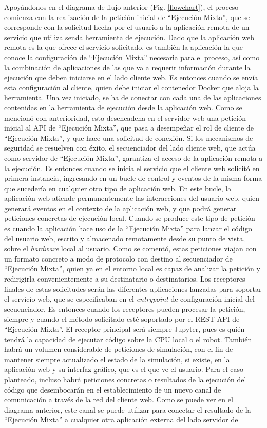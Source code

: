 Apoyándonos en el diagrama de flujo anterior (Fig. \ref{flowchart}), el proceso comienza con la realización de la petición inicial de ``Ejecución Mixta'', que se corresponde con la solicitud hecha por el usuario a la aplicación remota de un servicio que utiliza senda herramienta de ejecución. Dado que la aplicación web remota es la que ofrece el servicio solicitado, es también la aplicación la que conoce la configuración de ``Ejecución Mixta'' necesaria para el proceso, así como la combinación de aplicaciones de las que va a requerir información durante la ejecución que deben iniciarse en el lado cliente web. Es entonces cuando se envía esta configuración al cliente, quien debe iniciar el contenedor Docker que aloja la herramienta. Una vez iniciado, se ha de conectar con cada una de las aplicaciones contenidas en la herramienta de ejecución desde la aplicación web. Como se mencionó con anterioridad, esto desencadena en el servidor web una petición inicial al API de ``Ejecución Mixta'', que pasa a desempeñar el rol de cliente de ``Ejecución Mixta'', y que hace una solicitud de conexión. Si los mecanismos de seguridad se resuelven con éxito, el secuenciador del lado cliente web, que actúa como servidor de ``Ejecución Mixta'', garantiza el acceso de la aplicación remota a la ejecución. Es entonces cuando se inicia el servicio que el cliente web solicitó en primera instancia, ingresando en un bucle de control y eventos de la misma forma que sucedería en cualquier otro tipo de aplicación web. En este bucle, la aplicación web atiende permanentemente las interacciones del usuario web, quien generará eventos en el contexto de la aplicación web, y que podrá generar peticiones concretas de ejecución local. Cuando se produce este tipo de petición es cuando la aplicación hace uso de la ``Ejecución Mixta'' para lanzar el código del usuario web, escrito y almacenado remotamente desde su punto de vista, sobre el \textit{hardware} local al usuario. Como se comentó, estas peticiones viajan con un formato concreto a modo de protocolo con destino al secuenciador de ``Ejecución Mixta'', quien ya en el entorno local es capaz de analizar la petición y redirigirla convenientemente a su destinatario o destinatarios. Los receptores finales de estas solicitudes serán las diferentes aplicaciones lanzadas para soportar el servicio web, que se especificaban en el \textit{entrypoint} de configuración inicial del secuenciador. Es entonces cuando los receptores pueden procesar la petición, siempre y cuando el método solicitado esté soportado por el REST API de ``Ejecución Mixta''. El receptor principal será siempre Jupyter, pues es quién tendrá la capacidad de ejecutar código sobre la CPU local o el robot. También habrá un volumen considerable de peticiones de simulación, con el fin de mantener siempre actualizado el estado de la simulación, si existe, en la aplicación web y su interfaz gráfico, que es el que ve el usuario. Para el caso planteado, incluso habrá peticiones concretas o resultados de la ejecución del código que desembocarán en el establecimiento de un nuevo canal de comunicación a través de la red del cliente web. Como se puede ver en el diagrama anterior, este canal se puede utilizar para conectar el resultado de la ``Ejecución Mixta'' a cualquier otra aplicación externa del lado servidor de 